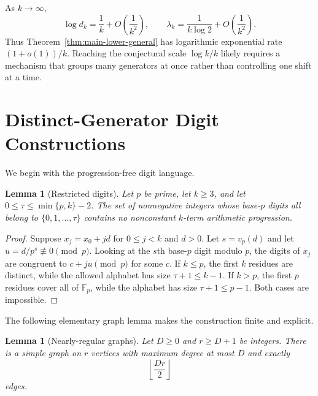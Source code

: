 \documentclass[11pt]{article}
\numberwithin{equation}{section}
\newtheorem{lemma}[theorem]{Lemma}
\theoremstyle{definition}
\theoremstyle{remark}
\newcommand{\F}{\mathbb{F}}
\newcommand{\floor}[1]{\left\lfloor #1\right\rfloor}
\begin{document}
\smallskip
\noindent
As $k\to\infty$,
\begin{equation}\label{eq:dk-large-k}
\log d_k=\frac1k+O\!\left(\frac1{k^2}\right),
\qquad
\lambda_k=\frac1{k\log2}+O\!\left(\frac1{k^2}\right).
\end{equation}
Thus Theorem~\ref{thm:main-lower-general} has logarithmic exponential rate $(1+o(1))/k$. Reaching the conjectural scale $\log k/k$ likely requires a mechanism that groups many generators at once rather than controlling one shift at a time.

\section{Distinct-Generator Digit Constructions}\label{sec:upper}

We begin with the progression-free digit language.

\begin{lemma}[Restricted digits]\label{lem:restricted-digits}
Let $p$ be prime, let $k\ge3$, and let $0\le\tau\le\min\{p,k\}-2$. The set of nonnegative integers whose base-$p$ digits all belong to $\{0,1,\ldots,\tau\}$ contains no nonconstant $k$-term arithmetic progression.
\end{lemma}

\begin{proof}
Suppose $x_j=x_0+jd$ for $0\le j<k$ and $d>0$. Let $s=v_p(d)$ and let $u=d/p^s\not\equiv0\pmod p$. Looking at the $s$th base-$p$ digit modulo $p$, the digits of $x_j$ are congruent to $c+ju\pmod p$ for some $c$. If $k\le p$, the first $k$ residues are distinct, while the allowed alphabet has size $\tau+1\le k-1$. If $k>p$, the first $p$ residues cover all of $\F_p$, while the alphabet has size $\tau+1\le p-1$. Both cases are impossible.
\end{proof}

\smallskip
\noindent
The following elementary graph lemma makes the construction finite and explicit.

\begin{lemma}[Nearly-regular graphs]\label{lem:nearly-regular-graph}
Let $D\ge0$ and $r\ge D+1$ be integers. There is a simple graph on $r$ vertices with maximum degree at most $D$ and exactly
\begin{equation}\label{eq:graph-edge-count}
\floor{\frac{Dr}{2}}
\end{equation}
edges.
\end{lemma}
\end{document}
